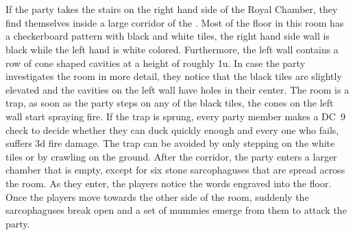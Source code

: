 {
}
%
\newpage
%
\\\\
%
If the party takes the stairs on the right hand side of the Royal Chamber, they find themselves inside a large corridor of the .
Most of the floor in this room has a checkerboard pattern with black and white tiles, the right hand side wall is black while the left hand is white colored.
Furthermore, the left wall contains a row of cone shaped cavities at a height of roughly 1u.
In case the party investigates the room in more detail, they notice that the black tiles are slightly elevated and the cavities on the left wall have holes in their center.
The room is a trap, as soon as the party steps on any of the black tiles, the cones on the left wall start spraying fire.
If the trap is sprung, every party member makes a DC~9 check to decide whether they can duck quickly enough and every one who fails, suffers 3d fire damage.
The trap can be avoided by only stepping on the white tiles or by crawling on the ground.
%
\vfill
%
After the corridor, the party enters a larger chamber that is empty, except for six stone sarcophaguses that are spread across the room.
As they enter, the players notice the words  engraved into the floor.
Once the players move towards the other side of the room, suddenly the sarcophaguses break open and a set of mummies emerge from them to attack the party.
